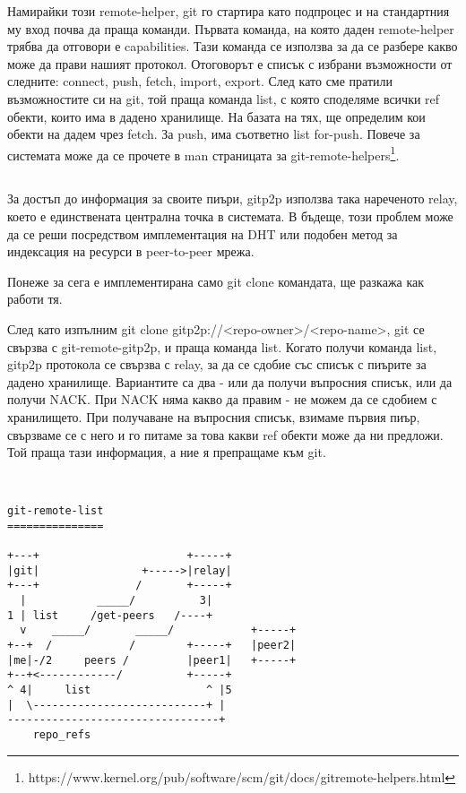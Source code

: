 \documentclass[a4paper,12pt]{article}
\begin{document}
Намирайки този remote-helper, git го стартира като подпроцес и на стандартния
му вход почва да праща команди. Първата команда, на която даден remote-helper
трябва да отговори е capabilities. Тази команда се използва за да се разбере
какво може да прави нашият протокол. Отоговорът е списък с избрани възможности
от следните: connect, push, fetch, import, export. След като сме пратили
възможностите си на git, той праща команда list, с която споделяме всички ref 
обекти, които има в дадено хранилище. На базата на тях, ще определим кои обекти
на дадем чрез fetch. За push, има съответно list for-push. Повече за системата
може да се прочете в man страницата за git-remote-helpers\footnote{https://www.kernel.org/pub/software/scm/git/docs/gitremote-helpers.html}.

\subsection{}

За достъп до информация за своите пиъри, gitp2p използва така нареченото relay,
което е единствената централна точка в системата. В бъдеще, този проблем може 
да се реши посредством имплементация на DHT или подобен метод за индексация на
ресурси в peer-to-peer мрежа.

Понеже за сега е имплементирана само git clone командата, ще разкажа как работи
тя.

След като изпълним git clone gitp2p://<repo-owner>/<repo-name>, git се свързва
с git-remote-gitp2p, и праща команда list. Когато получи команда list, gitp2p 
протокола се свързва с relay, за да се сдобие със списък с пиърите за дадено
хранилище. Вариантите са два - или да получи въпросния списък, или да получи
NACK. При NACK няма какво да правим - не можем да се сдобием с хранилището. При
получаване на въпросния списък, взимаме първия пиър, свързваме се с него и го
питаме за това какви ref обекти може да ни предложи. Той праща тази информация,
а ние я препращаме към git.

\begin{verbatim}
 

git-remote-list
===============

+---+                       +-----+
|git|                +----->|relay|
+---+               /       +-----+
  |           _____/          3|
1 | list     /get-peers   /----+  
  v    _____/       _____/            +-----+
+--+  /            /        +-----+   |peer2|
|me|-/2     peers /         |peer1|   +-----+
+--+<------------/          +-----+
^ 4|     list                  ^ |5
|  \---------------------------+ |
---------------------------------+
    repo_refs
\end{verbatim}
\end{document}
